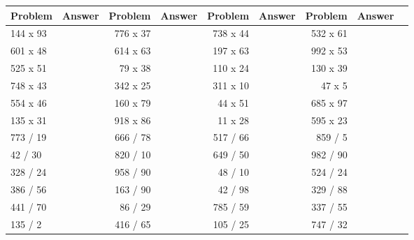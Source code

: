 \LARGE
\begin{tabular}{|l|r|r|r|r|r|r|r|r|}
\toprule
  Problem & Answer &   Problem & Answer &   Problem & Answer &   Problem & Answer \\ \midrule
\midrule
 144 x 93 &        &  776 x 37 &        &  738 x 44 &        &  532 x 61 &        \\ \midrule
 601 x 48 &        &  614 x 63 &        &  197 x 63 &        &  992 x 53 &        \\ \midrule
 525 x 51 &        &   79 x 38 &        &  110 x 24 &        &  130 x 39 &        \\ \midrule
 748 x 43 &        &  342 x 25 &        &  311 x 10 &        &    47 x 5 &        \\ \midrule
 554 x 46 &        &  160 x 79 &        &   44 x 51 &        &  685 x 97 &        \\ \midrule
 135 x 31 &        &  918 x 86 &        &   11 x 28 &        &  595 x 23 &        \\ \midrule
 773 / 19 &        &  666 / 78 &        &  517 / 66 &        &   859 / 5 &        \\ \midrule
  42 / 30 &        &  820 / 10 &        &  649 / 50 &        &  982 / 90 &        \\ \midrule
 328 / 24 &        &  958 / 90 &        &   48 / 10 &        &  524 / 24 &        \\ \midrule
 386 / 56 &        &  163 / 90 &        &   42 / 98 &        &  329 / 88 &        \\ \midrule
 441 / 70 &        &   86 / 29 &        &  785 / 59 &        &  337 / 55 &        \\ \midrule
  135 / 2 &        &  416 / 65 &        &  105 / 25 &        &  747 / 32 &        \\ \midrule
\bottomrule
\end{tabular}
